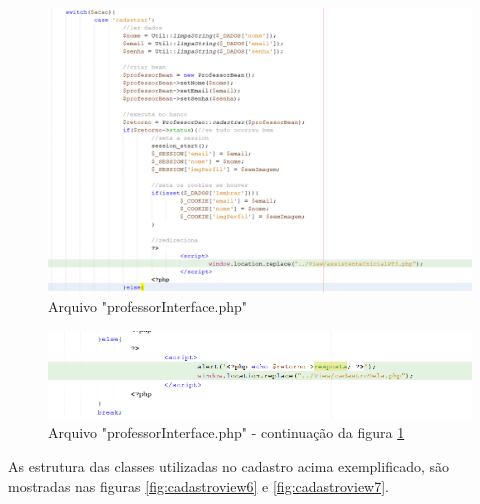 \begin{figure}[!htb]
	\centering
	\includegraphics[width=0.9\linewidth]{cadastroView4}
	\caption{Arquivo "professorInterface.php"}
	\label{fig:cadastroview4}
\end{figure}

\begin{figure}[!htb]
	\centering
	\includegraphics[width=0.9\linewidth]{cadastroView5}
	\caption{Arquivo "professorInterface.php"  - continuação da figura \ref{fig:cadastroview4}}
	\label{fig:cadastroview5}
\end{figure}

As estrutura das classes utilizadas no cadastro acima exemplificado, são mostradas nas figuras \ref{fig:cadastroview6} e \ref{fig:cadastroview7}.

